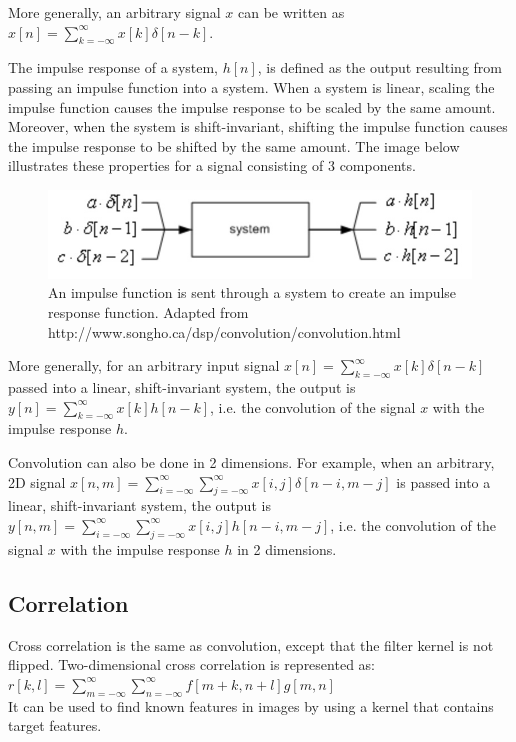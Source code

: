 \documentclass{article}
\begin{document}
More generally, an arbitrary signal $x$ can be written as $x[n] = \sum_{k = -\infty}^{\infty} x[k]\delta[n-k]$.

The impulse response of a system, $h[n]$, is defined as the output resulting from passing an impulse function into a system. When a system is linear, scaling the impulse function causes the impulse response to be scaled by the same amount. Moreover, when the system is shift-invariant, shifting the impulse function causes the impulse response to be shifted by the same amount. The image below illustrates these properties for a signal consisting of 3 components. 


\begin{figure}[h!]
\begin{center}
\includegraphics[scale=0.4]{impulse_response.jpeg}
\caption{An impulse function is sent through a system to create an impulse response function. Adapted from http://www.songho.ca/dsp/convolution/convolution.html}
\end{center}
\end{figure}


More generally, for an arbitrary input signal $x[n] = \sum_{k = -\infty}^{\infty} x[k]\delta[n-k]$ passed into a linear, shift-invariant system, the output is $y[n] = \sum_{k = -\infty}^{\infty} x[k]h[n-k]$, i.e. the convolution of the signal $x$ with the impulse response $h$.  

Convolution can also be done in 2 dimensions. For example, when an arbitrary, 2D signal $x[n, m] = \sum_{i = -\infty}^{\infty}\sum_{j = -\infty}^{\infty} x[i, j]\delta[n-i, m-j]$ is passed into a linear, shift-invariant system, the output is $y[n,m] = \sum_{i = -\infty}^{\infty}\sum_{j = -\infty}^{\infty} x[i, j]h[n-i, m-j]$, i.e. the convolution of the signal $x$ with the impulse response $h$ in 2 dimensions. 


\subsection{Correlation}

Cross correlation is the same as convolution, except that the filter kernel is not flipped. Two-dimensional cross correlation is represented as: \\
$r[k,l] = \sum_{m=-\infty} ^\infty \sum_{n=-\infty} ^\infty f[m+k, n+l]g[m, n]$\\
It can be used to find known features in images by using a kernel that contains target features. 
\end{document}
